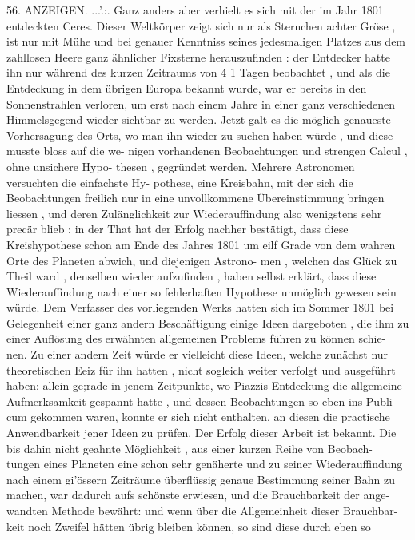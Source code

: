 \documentclass[12pt,a4paper]{article}
\begin{document}
\newpage

56.  ANZEIGEN.
...'.:. Ganz  anders  aber  verhielt  es  sich  mit  der  im  Jahr  1801  entdeckten  Ceres.
Dieser  Weltkörper  zeigt  sich  nur  als  Sternchen  achter  Gröse ,  ist  nur  mit  Mühe
und  bei  genauer  Kenntniss  seines  jedesmaligen  Platzes  aus  dem  zahllosen  Heere
ganz  ähnlicher  Fixsterne  herauszufinden :  der  Entdecker  hatte  ihn  nur  während
des  kurzen  Zeitraums  von  4 1  Tagen  beobachtet ,  und  als  die  Entdeckung  in  dem
übrigen  Europa  bekannt  wurde,  war  er  bereits  in  den  Sonnenstrahlen  verloren,
um  erst  nach  einem  Jahre  in  einer  ganz  verschiedenen  Himmelsgegend  wieder
sichtbar  zu  werden.  Jetzt  galt  es  die  möglich  genaueste  Vorhersagung  des  Orts,
wo  man  ihn  wieder  zu  suchen  haben  würde ,  und  diese  musste  bloss  auf  die  we-
nigen vorhandenen  Beobachtungen  und  strengen  Calcul ,  ohne  unsichere  Hypo-
thesen ,  gegründet  werden.  Mehrere  Astronomen  versuchten  die  einfachste  Hy-
pothese, eine  Kreisbahn,  mit  der  sich  die  Beobachtungen  freilich  nur  in  eine
unvollkommene  Übereinstimmung  bringen  liessen ,  und  deren  Zulänglichkeit  zur
Wiederauffindung  also  wenigstens  sehr  precär  blieb :  in  der  That  hat  der  Erfolg
nachher  bestätigt,  dass  diese  Kreishypothese  schon  am  Ende  des  Jahres  1801  um
eilf  Grade  von  dem  wahren  Orte  des  Planeten  abwich,  und  diejenigen  Astrono-
men ,  welchen  das  Glück  zu  Theil  ward ,  denselben  wieder  aufzufinden ,  haben
selbst  erklärt,  dass  diese  Wiederauffindung  nach  einer  so  fehlerhaften  Hypothese
unmöglich  gewesen  sein  würde.
Dem  Verfasser  des  vorliegenden  Werks  hatten  sich  im  Sommer  1801  bei
Gelegenheit  einer  ganz  andern  Beschäftigung  einige  Ideen  dargeboten ,  die  ihm
zu  einer  Auflösung  des  erwähnten  allgemeinen  Problems  führen  zu  können  schie-
nen. Zu  einer  andern  Zeit  würde  er  vielleicht  diese  Ideen,  welche  zunächst  nur
theoretischen  Eeiz  für  ihn  hatten ,  nicht  sogleich  weiter  verfolgt  und  ausgeführt
haben:  allein  ge;rade  in  jenem  Zeitpunkte,  wo  Piazzis  Entdeckung  die  allgemeine
Aufmerksamkeit  gespannt  hatte ,  und  dessen  Beobachtungen  so  eben  ins  Publi-
cum gekommen  waren,  konnte  er  sich  nicht  enthalten,  an  diesen  die  practische
Anwendbarkeit  jener  Ideen  zu  prüfen.  Der  Erfolg  dieser  Arbeit  ist  bekannt.
Die  bis  dahin  nicht  geahnte  Möglichkeit ,  aus  einer  kurzen  Reihe  von  Beobach-
tungen eines  Planeten  eine  schon  sehr  genäherte  und  zu  seiner  Wiederauffindung
nach  einem  gi'össern  Zeiträume  überflüssig  genaue  Bestimmung  seiner  Bahn  zu
machen,  war  dadurch  aufs  schönste  erwiesen,  und  die  Brauchbarkeit  der  ange-
wandten Methode  bewährt:  und  wenn  über  die  Allgemeinheit  dieser  Brauchbar-
keit  noch  Zweifel  hätten  übrig   bleiben   können,  so   sind  diese  durch  eben  so
\end{document}
